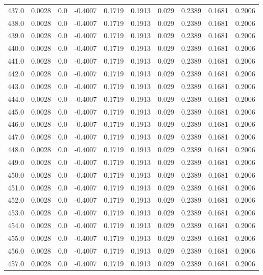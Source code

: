 \begin{longtable}{lrrrrrrrrr}
437.0 & 0.0028 & 0.0 & -0.4007 & 0.1719 & 0.1913 & 0.029 & 0.2389 & 0.1681 & 0.2006 \\
438.0 & 0.0028 & 0.0 & -0.4007 & 0.1719 & 0.1913 & 0.029 & 0.2389 & 0.1681 & 0.2006 \\
439.0 & 0.0028 & 0.0 & -0.4007 & 0.1719 & 0.1913 & 0.029 & 0.2389 & 0.1681 & 0.2006 \\
440.0 & 0.0028 & 0.0 & -0.4007 & 0.1719 & 0.1913 & 0.029 & 0.2389 & 0.1681 & 0.2006 \\
441.0 & 0.0028 & 0.0 & -0.4007 & 0.1719 & 0.1913 & 0.029 & 0.2389 & 0.1681 & 0.2006 \\
442.0 & 0.0028 & 0.0 & -0.4007 & 0.1719 & 0.1913 & 0.029 & 0.2389 & 0.1681 & 0.2006 \\
443.0 & 0.0028 & 0.0 & -0.4007 & 0.1719 & 0.1913 & 0.029 & 0.2389 & 0.1681 & 0.2006 \\
444.0 & 0.0028 & 0.0 & -0.4007 & 0.1719 & 0.1913 & 0.029 & 0.2389 & 0.1681 & 0.2006 \\
445.0 & 0.0028 & 0.0 & -0.4007 & 0.1719 & 0.1913 & 0.029 & 0.2389 & 0.1681 & 0.2006 \\
446.0 & 0.0028 & 0.0 & -0.4007 & 0.1719 & 0.1913 & 0.029 & 0.2389 & 0.1681 & 0.2006 \\
447.0 & 0.0028 & 0.0 & -0.4007 & 0.1719 & 0.1913 & 0.029 & 0.2389 & 0.1681 & 0.2006 \\
448.0 & 0.0028 & 0.0 & -0.4007 & 0.1719 & 0.1913 & 0.029 & 0.2389 & 0.1681 & 0.2006 \\
449.0 & 0.0028 & 0.0 & -0.4007 & 0.1719 & 0.1913 & 0.029 & 0.2389 & 0.1681 & 0.2006 \\
450.0 & 0.0028 & 0.0 & -0.4007 & 0.1719 & 0.1913 & 0.029 & 0.2389 & 0.1681 & 0.2006 \\
451.0 & 0.0028 & 0.0 & -0.4007 & 0.1719 & 0.1913 & 0.029 & 0.2389 & 0.1681 & 0.2006 \\
452.0 & 0.0028 & 0.0 & -0.4007 & 0.1719 & 0.1913 & 0.029 & 0.2389 & 0.1681 & 0.2006 \\
453.0 & 0.0028 & 0.0 & -0.4007 & 0.1719 & 0.1913 & 0.029 & 0.2389 & 0.1681 & 0.2006 \\
454.0 & 0.0028 & 0.0 & -0.4007 & 0.1719 & 0.1913 & 0.029 & 0.2389 & 0.1681 & 0.2006 \\
455.0 & 0.0028 & 0.0 & -0.4007 & 0.1719 & 0.1913 & 0.029 & 0.2389 & 0.1681 & 0.2006 \\
456.0 & 0.0028 & 0.0 & -0.4007 & 0.1719 & 0.1913 & 0.029 & 0.2389 & 0.1681 & 0.2006 \\
457.0 & 0.0028 & 0.0 & -0.4007 & 0.1719 & 0.1913 & 0.029 & 0.2389 & 0.1681 & 0.2006 \\

\end{longtable}
